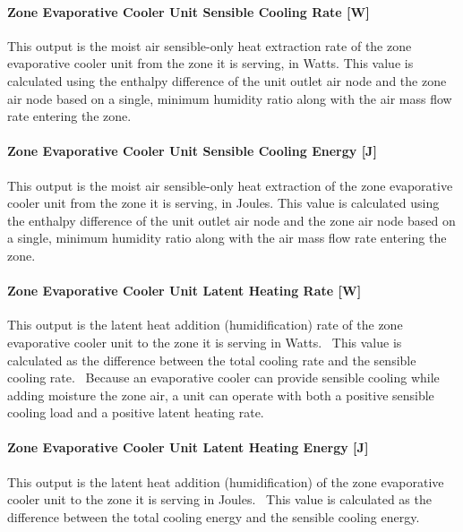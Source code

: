 \paragraph{Zone Evaporative Cooler Unit Sensible Cooling Rate {[}W{]}}\label{zone-evaporative-cooler-unit-sensible-cooling-rate-w}

This output is the moist air sensible-only heat extraction rate of the zone evaporative cooler unit from the zone it is serving, in Watts. This value is calculated using the enthalpy difference of the unit outlet air node and the zone air node based on a single, minimum humidity ratio along with the air mass flow rate entering the zone.

\paragraph{Zone Evaporative Cooler Unit Sensible Cooling Energy {[}J{]}}\label{zone-evaporative-cooler-unit-sensible-cooling-energy-j}

This output is the moist air sensible-only heat extraction of the zone evaporative cooler unit from the zone it is serving, in Joules. This value is calculated using the enthalpy difference of the unit outlet air node and the zone air node based on a single, minimum humidity ratio along with the air mass flow rate entering the zone.

\paragraph{Zone Evaporative Cooler Unit Latent Heating Rate {[}W{]}}\label{zone-evaporative-cooler-unit-latent-heating-rate-w}

This output is the latent heat addition (humidification) rate of the zone evaporative cooler unit to the zone it is serving in Watts.~ This value is calculated as the difference between the total cooling rate and the sensible cooling rate.~ Because an evaporative cooler can provide sensible cooling while adding moisture the zone air, a unit can operate with both a positive sensible cooling load and a positive latent heating rate.

\paragraph{Zone Evaporative Cooler Unit Latent Heating Energy {[}J{]}}\label{zone-evaporative-cooler-unit-latent-heating-energy-j}

This output is the latent heat addition (humidification) of the zone evaporative cooler unit to the zone it is serving in Joules.~ This value is calculated as the difference between the total cooling energy and the sensible cooling energy.

